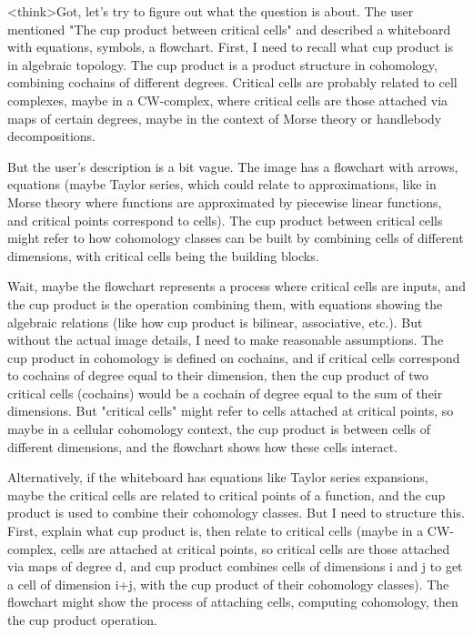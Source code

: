 <think>Got, let's try to figure out what the question is about. The user mentioned "The cup product between critical cells" and described a whiteboard with equations, symbols, a flowchart. First, I need to recall what cup product is in algebraic topology. The cup product is a product structure in cohomology, combining cochains of different degrees. Critical cells are probably related to cell complexes, maybe in a CW-complex, where critical cells are those attached via maps of certain degrees, maybe in the context of Morse theory or handlebody decompositions.

But the user's description is a bit vague. The image has a flowchart with arrows, equations (maybe Taylor series, which could relate to approximations, like in Morse theory where functions are approximated by piecewise linear functions, and critical points correspond to cells). The cup product between critical cells might refer to how cohomology classes can be built by combining cells of different dimensions, with critical cells being the building blocks. 

Wait, maybe the flowchart represents a process where critical cells are inputs, and the cup product is the operation combining them, with equations showing the algebraic relations (like how cup product is bilinear, associative, etc.). But without the actual image details, I need to make reasonable assumptions. The cup product in cohomology is defined on cochains, and if critical cells correspond to cochains of degree equal to their dimension, then the cup product of two critical cells (cochains) would be a cochain of degree equal to the sum of their dimensions. But "critical cells" might refer to cells attached at critical points, so maybe in a cellular cohomology context, the cup product is between cells of different dimensions, and the flowchart shows how these cells interact.

Alternatively, if the whiteboard has equations like Taylor series expansions, maybe the critical cells are related to critical points of a function, and the cup product is used to combine their cohomology classes. But I need to structure this. First, explain what cup product is, then relate to critical cells (maybe in a CW-complex, cells are attached at critical points, so critical cells are those attached via maps of degree d, and cup product combines cells of dimensions i and j to get a cell of dimension i+j, with the cup product of their cohomology classes). The flowchart might show the process of attaching cells, computing cohomology, then the cup product operation.

